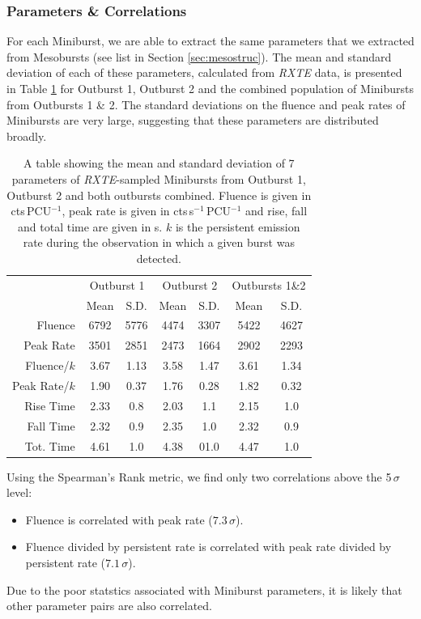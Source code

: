 \subsubsection{Parameters \& Correlations}

\par For each Miniburst, we are able to extract the same parameters that we extracted from Mesobursts (see list in Section \ref{sec:mesostruc}).  The mean and standard deviation of each of these parameters, calculated from \textit{RXTE} data, is presented in Table \ref{tab:mini_param} for Outburst 1, Outburst 2 and the combined population of Minibursts from Outbursts 1 \& 2.  The standard deviations on the fluence and peak rates of Minibursts are very large, suggesting that these parameters are distributed broadly.

\begin{table}
\centering
\begin{tabular}{r c c c c c c}
\hline
\hline
 & \multicolumn{2}{c}{\scriptsize Outburst 1} & \multicolumn{2}{c}{\scriptsize Outburst 2} & \multicolumn{2}{c}{\scriptsize Outbursts 1\&2}  \\
 &Mean&S.D.&Mean&S.D.&Mean&S.D.\\
\hline
\scriptsize Fluence&6792&5776&4474&3307&5422&4627\\
\scriptsize Peak Rate&3501&2851&2473&1664&2902&2293\\
\scriptsize Fluence/$k$&3.67&1.13&3.58&1.47&3.61&1.34\\
\scriptsize Peak Rate/$k$&1.90&0.37&1.76&0.28&1.82&0.32\\
\scriptsize Rise Time&2.33&0.8&2.03&1.1&2.15&1.0\\
\scriptsize Fall Time&2.32&0.9&2.35&1.0&2.32&0.9\\
\scriptsize Tot. Time&4.61&1.0&4.38&01.0&4.47&1.0\\
\hline
\hline
\end{tabular}
\caption{A table showing the mean and standard deviation of 7 parameters of \textit{RXTE}-sampled Minibursts from Outburst 1, Outburst 2 and both outbursts combined.  Fluence is given in cts\,PCU$^{-1}$, peak rate is given in cts\,s$^{-1}$\,PCU$^{-1}$ and rise, fall and total time are given in s.  $k$ is the persistent emission rate during the observation in which a given burst was detected.}
\label{tab:mini_param}
\end{table}

\par Using the Spearman's Rank metric, we find only two correlations above the 5$\,\sigma$ level:
\begin{itemize}
\item Fluence is correlated with peak rate ($7.3\,\sigma$).
\item Fluence divided by persistent rate is correlated with peak rate divided by persistent rate ($7.1\,\sigma$).
\end{itemize}
Due to the poor statstics associated with Miniburst parameters, it is likely that other parameter pairs are also correlated.

